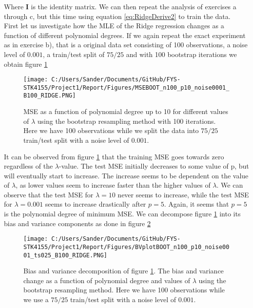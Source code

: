 \documentclass[12pt,a4paper]{article}
\begin{document}
\noindent Where $\textbf{I}$ is the identity matrix. We can then repeat the analysis of exercises a through c, but this time using equation \ref{eq:RidgeDerive2} to train the data. 
\\
First let us investigate how the MLE of the Ridge regression changes as a function of different polynomial degrees. If we again repeat the exact experiment as in exercise b), that is a original data set consisting of 100 observations, a noise level of $0.001$, a train/test split of $75/25$ and with 100 bootstrap iterations we obtain figure \ref{fig:MSERidgeBoot3}

\begin{figure}[H]
\centering
\texttt{[image: C:/Users/Sander/Documents/GitHub/FYS-STK4155/Project1/Report/Figures/MSEBOOT\_n100\_p10\_noise0001\_B100\_RIDGE.PNG]}
\caption{\label{fig:MSERidgeBoot3} MSE as a function of polynomial degree up to 10 for different values of $\lambda$ using the bootstrap resampling method with 100 iterations. Here we have 100 observations while we split the data into $75/25$ train/test split with a noise level of $0.001$.}
\end{figure}

\noindent It can be observed from figure \ref{fig:MSERidgeBoot3} that the training MSE goes towards zero regardless of the $\lambda$-value. The test MSE initially decreases to some value of p, but will eventually start to increase. The increase seems to be dependent on the value of $\lambda$, as lower values seem to increase faster than the higher values of $\lambda$. We can observe that the test MSE for $\lambda = 10$ never seems to increase, while the test MSE for $\lambda = 0.001$ seems to increase drastically after $p = 5$. Again, it seems that $p = 5$ is the polynomial degree of minimum MSE. We can decompose figure \ref{fig:MSERidgeBoot3} into its bias and variance components as done in figure \ref{fig:BVRidge1}

\begin{figure}[H]
\centering
\texttt{[image: C:/Users/Sander/Documents/GitHub/FYS-STK4155/Project1/Report/Figures/BVplotBOOT\_n100\_p10\_noise0001\_ts025\_B100\_RIDGE.PNG]}
\caption{\label{fig:BVRidge1} Bias and variance decomposition of figure \ref{fig:MSERidgeBoot3}. The bias and variance change as a function of polynomial degree and values of $\lambda$ using the bootstrap resampling method. Here we have 100 observations while we use a $75/25$ train/test split with a noise level of $0.001$.}
\end{figure}
\end{document}
